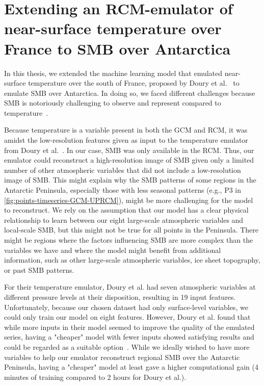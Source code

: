 \documentclass[a4paper,11pt,oneside]{report}
\begin{document}
\section{Extending an RCM-emulator of near-surface temperature over France to SMB over Antarctica}\label{sec:extension-doury}

In this thesis, we extended the machine learning model that emulated near-surface temperature over the south of France, proposed by Doury et al.~\cite{Doury} to emulate SMB over Antarctica. In doing so, we faced different challenges because SMB is notoriously challenging to observe and represent compared to temperature~\cite{Lenaerts2019}. 


Because temperature is a variable present in both the GCM and RCM, it was amidst the low-resolution features given as input to the temperature emulator from Doury et al.~\cite{Doury}. In our case, SMB was only available in the RCM. Thus, our emulator could reconstruct a high-resolution image of SMB given only a limited number of other atmospheric variables that did not include a low-resolution image of SMB. This might explain why the SMB patterns of some regions in the Antarctic Peninsula, especially those with less seasonal patterns (e.g., P3 in \autoref{fig:points-timeseries-GCM-UPRCM}), might be more challenging for the model to reconstruct. We rely on the assumption that our model has a clear physical relationship to learn between our eight large-scale atmospheric variables and local-scale SMB, but this might not be true for all points in the Peninsula. There might be regions where the factors influencing SMB are more complex than the variables we have and where the model might benefit from additional information, such as other large-scale atmospheric variables, ice sheet topography, or past SMB patterns. 


For their temperature emulator, Doury et al. had seven atmospheric variables at different pressure levels at their disposition, resulting in 19 input features. Unfortunately, because our chosen dataset had only surface-level variables, we could only train our model on eight features. However, Doury et al. found that while more inputs in their model seemed to improve the quality of the emulated series, having a "cheaper" model with fewer inputs showed satisfying results and could be regarded as a suitable option~\cite{Doury}. While we ideally wished to have more variables to help our emulator reconstruct regional SMB over the Antarctic Peninsula, having a "cheaper" model at least gave a higher computational gain (4 minutes of training compared to 2 hours for Doury et al.).  
\end{document}
